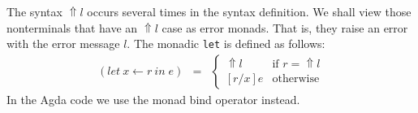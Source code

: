 \documentclass[runningheads]{llncs}
\newcommand{\error}[1]{\ensuremath{\mathop{\Uparrow}#1}}
\newcommand{\mlet}[3]{\ensuremath{
\mathit{let}\ {#1\leftarrow#2}\ \mathit{in}\;#3}}
\begin{document}
The syntax \error{l} occurs several times in the syntax definition. We shall 
view those nonterminals that have an \error{l} case as error monads.
That is, they raise an error with the error message $l$.
The monadic \texttt{let} is defined as follows:
\[
\begin{array}{rcll}
  (\mlet{x}{r}{e}) & = &
  \begin{cases}
    \error{l} & \text{if } r = \error{l} \\
    [r/x]e & \text{otherwise}
  \end{cases}
\end{array}
\]
In the Agda code we use the monad bind operator instead.
\end{document}
